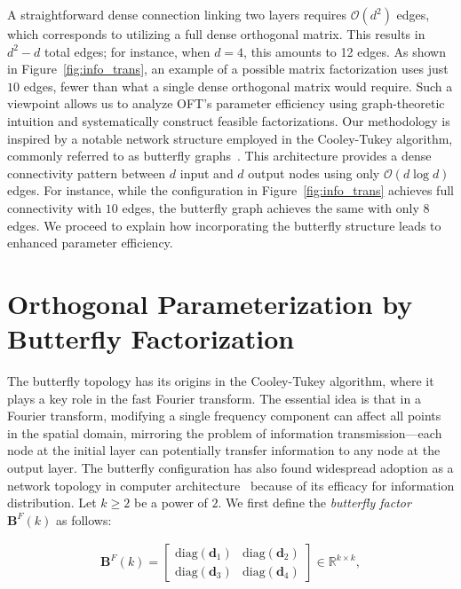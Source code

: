 A straightforward dense connection linking two layers requires $\mathcal{O}(d^2)$ edges, which corresponds to utilizing a full dense orthogonal matrix. This results in $d^2-d$ total edges; for instance, when $d=4$, this amounts to 12 edges. As shown in Figure~\ref{fig:info_trans}, an example of a possible matrix factorization uses just $10$ edges, fewer than what a single dense orthogonal matrix would require. Such a viewpoint allows us to analyze OFT’s parameter efficiency using graph-theoretic intuition and systematically construct feasible factorizations. Our methodology is inspired by a notable network structure employed in the Cooley-Tukey algorithm, commonly referred to as butterfly graphs~\cite{cooley1965algorithm}. This architecture provides a dense connectivity pattern between $d$ input and $d$ output nodes using only $\mathcal{O}(d\log d)$ edges. For instance, while the configuration in Figure~\ref{fig:info_trans} achieves full connectivity with $10$ edges, the butterfly graph achieves the same with only $8$ edges. We proceed to explain how incorporating the butterfly structure leads to enhanced parameter efficiency.

\section{Orthogonal Parameterization by Butterfly Factorization}

The butterfly topology has its origins in the Cooley-Tukey algorithm, where it plays a key role in the fast Fourier transform. The essential idea is that in a Fourier transform, modifying a single frequency component can affect all points in the spatial domain, mirroring the problem of information transmission—each node at the initial layer can potentially transfer information to any node at the output layer. The butterfly configuration has also found widespread adoption as a network topology in computer architecture~\cite{solihin2015fundamentals,li2011linear} because of its efficacy for information distribution. Let $k\geq 2$ be a power of $2$. We first define the \emph{butterfly factor} $\bm{B}^F(k)$ as follows:

\begin{equation}\label{eq:but_factor}
\begin{aligned}
    \bm{B}^F(k)=\begin{bmatrix}
    \text{diag}(\bm{d}_1) & \text{diag}(\bm{d}_2) \\
    \text{diag}(\bm{d}_3) & \text{diag}(\bm{d}_4)
    \end{bmatrix}\in\mathbb{R}^{k\times k},
\end{aligned}
\end{equation}

